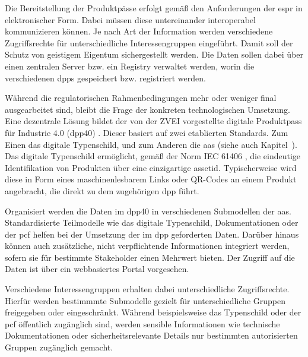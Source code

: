 Die Bereitstellung der Produktpässe erfolgt gemäß den Anforderungen der \acs{espr} in elektronischer Form. 
Dabei müssen diese untereinander interoperabel kommunizieren können.
Je nach Art der Information werden verschiedene Zugriffsrechte für unterschiedliche Interessengruppen eingeführt. 
Damit soll der Schutz von geistigem Eigentum sichergestellt werden.
Die Daten sollen dabei über einen zentralen Server bzw. ein Registry verwaltet werden, worin die verschiedenen \acsp{dpp} gespeichert bzw. registriert werden.
\cite{CIRPASS}

Während die regulatorischen Rahmenbedingungen mehr oder weniger final ausgearbeitet sind, bleibt die Frage der konkreten technologischen Umsetzung.
Eine dezentrale Lösung bildet der von der ZVEI vorgestellte digitale Produktpass für Industrie 4.0 (\acs{dpp40}) \cite{DPP40}.
Dieser basiert auf zwei etablierten Standards. 
Zum Einen das digitale Typenschild, und zum Anderen die \acs{aas} (siehe auch Kapitel~).
Das digitale Typenschild ermöglicht, gemäß der Norm IEC 61406 \cite{TypenschildIEC61406-1}, die eindeutige Identifikation von Produkten über eine einzigartige \acs{assetid}.
Typischerweise wird diese in Form eines maschinenlesbarem Links oder QR-Codes an einem Produkt angebracht, die direkt zu dem zugehörigen \acs{dpp} führt.

Organisiert werden die Daten im \acs{dpp40} in verschiedenen Submodellen der \acs{aas}. 
Standardisierte Teilmodelle wie das digitale Typenschild, Dokumentationen oder der \ac{pcf} helfen bei der Umsetzung der im \acs{dpp} geforderten Daten.
Darüber hinaus können auch zusätzliche, nicht verpflichtende Informationen integriert werden, sofern sie für bestimmte Stakeholder einen Mehrwert bieten.
Der Zugriff auf die Daten ist über ein webbasiertes Portal vorgesehen. 

Verschiedene Interessengruppen erhalten dabei unterschiedliche Zugriffsrechte. 
Hierfür werden bestimmmte Submodelle gezielt für unterschiedliche Gruppen freigegeben oder eingeschränkt.
Während beispielsweise das Typenschild oder der \acs{pcf} öffentlich zugänglich sind, werden sensible Informationen wie technische Dokumentationen oder sicherheitsrelevante Details nur bestimmten autorisierten Gruppen zugänglich gemacht.


